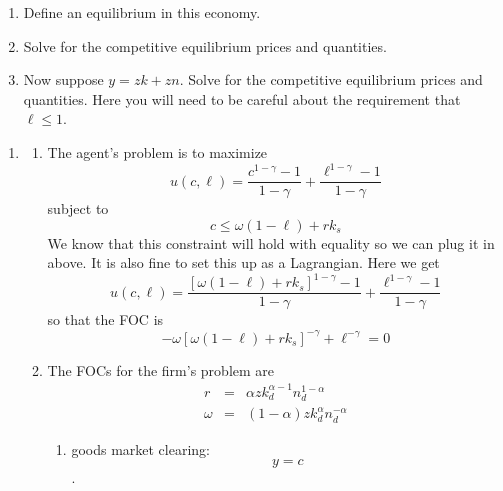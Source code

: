 \documentclass{article}
\begin{document}
\begin{enumerate}
\begin{enumerate}
\item Define an equilibrium in this economy.

\item Solve for the competitive equilibrium prices and quantities.

\item Now suppose $y=zk+zn.$ Solve for the competitive equilibrium prices
and quantities. Here you will need to be careful about the requirement that $%
\ell \leq 1.$\pagebreak
\end{enumerate}
\end{enumerate}

\begin{enumerate}
\item 
\begin{enumerate}
\item The agent's problem is to maximize%
\begin{equation*}
u\left( c,\ell \right) =\frac{c^{1-\gamma }-1}{1-\gamma }+\frac{\ell
^{1-\gamma }-1}{1-\gamma }
\end{equation*}%
subject to 
\begin{equation*}
c\leq \omega \left( 1-\ell \right) +rk_{s}
\end{equation*}%
We know that this constraint will hold with equality so we can plug it in
above. It is also fine to set this up as a Lagrangian. Here we get 
\begin{equation*}
u\left( c,\ell \right) =\frac{\left[ \omega \left( 1-\ell \right) +rk_{s}%
\right] ^{1-\gamma }-1}{1-\gamma }+\frac{\ell ^{1-\gamma }-1}{1-\gamma }
\end{equation*}%
so that the FOC is 
\begin{equation}
-\omega \left[ \omega \left( 1-\ell \right) +rk_{s}\right] ^{-\gamma }+\ell
^{-\gamma }=0  \label{ut}
\end{equation}

\item The FOCs for the firm's problem are 
\begin{eqnarray}
r &=&\alpha zk_{d}^{\alpha -1}n_{d}^{1-\alpha }  \label{r} \\
\omega &=&\left( 1-\alpha \right) zk_{d}^{\alpha }n_{d}^{-\alpha }
\label{w2}
\end{eqnarray}

\begin{enumerate}
\item goods market clearing: 
\begin{equation}
y=c  \label{m1}
\end{equation}%
$.$


\end{enumerate}
\end{enumerate}
\end{enumerate}
\end{document}
